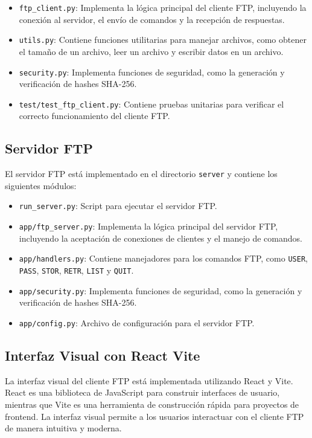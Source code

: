 \documentclass[a4paper, 12pt]{article}
\begin{document}
\begin{itemize}
    \item \texttt{ftp\_client.py}: Implementa la lógica principal del cliente FTP, incluyendo la conexión al servidor, el envío de comandos y la recepción de respuestas.
    \item \texttt{utils.py}: Contiene funciones utilitarias para manejar archivos, como obtener el tamaño de un archivo, leer un archivo y escribir datos en un archivo.
    \item \texttt{security.py}: Implementa funciones de seguridad, como la generación y verificación de hashes SHA-256.
    \item \texttt{test/test\_ftp\_client.py}: Contiene pruebas unitarias para verificar el correcto funcionamiento del cliente FTP.
\end{itemize}

\subsection{Servidor FTP}
El servidor FTP está implementado en el directorio \texttt{server} y contiene los siguientes módulos:

\begin{itemize}
    \item \texttt{run\_server.py}: Script para ejecutar el servidor FTP.
    \item \texttt{app/ftp\_server.py}: Implementa la lógica principal del servidor FTP, incluyendo la aceptación de conexiones de clientes y el manejo de comandos.
    \item \texttt{app/handlers.py}: Contiene manejadores para los comandos FTP, como \texttt{USER}, \texttt{PASS}, \texttt{STOR}, \texttt{RETR}, \texttt{LIST} y \texttt{QUIT}.
    \item \texttt{app/security.py}: Implementa funciones de seguridad, como la generación y verificación de hashes SHA-256.
    \item \texttt{app/config.py}: Archivo de configuración para el servidor FTP.
\end{itemize}

\subsection{Interfaz Visual con React Vite}
La interfaz visual del cliente FTP está implementada utilizando React y Vite. React es una biblioteca de JavaScript para construir interfaces de usuario, mientras que Vite es una herramienta de construcción rápida para proyectos de frontend. La interfaz visual permite a los usuarios interactuar con el cliente FTP de manera intuitiva y moderna.
\end{document}
